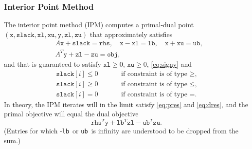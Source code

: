 \documentclass{article}
\newcommand{\ct}{\texttt}
\newcommand{\rvec}[1]{\left(#1\right)}
\newcommand{\obj}{\ct{obj}}
\newcommand{\rhs}{\ct{rhs}}
\newcommand{\lb}{\ct{lb}}
\newcommand{\ub}{\ct{ub}}
\newcommand{\x}{\ct{x}}
\newcommand{\slack}{\ct{slack}}
\newcommand{\xl}{\ct{xl}}
\newcommand{\xu}{\ct{xu}}
\newcommand{\y}{\ct{y}}
\newcommand{\zl}{\ct{zl}}
\newcommand{\zu}{\ct{zu}}
\begin{document}
\subsubsection*{Interior Point Method}
The interior point method (IPM) computes a primal-dual point
$\rvec{\x,\slack,\xl,\xu,\y,\zl,\zu}$ that approximately satisfies
\begin{subequations}
  \label{eq:res}
  \begin{align}
    \label{eq:pres}
    &A\x+\slack=\rhs, \quad \x-\xl=\lb, \quad \x+\xu=\ub,\\
    \label{eq:dres}
    &A^T\y+\zl-\zu=\obj,
  \end{align}
\end{subequations}
and that is guaranteed to satisfy $\xl\ge0$, $\xu\ge0$, \eqref{eq:signy} and
\begin{subequations}
  \label{eq:signslack}
  \begin{alignat}{2}
    \slack[i]\le0 &\quad& &\text{if constraint is of type $\ge$,} \\
    \slack[i]\ge0 && &\text{if constraint is of type $\le$,} \\
    \slack[i]=0 && &\text{if constraint is of type $=$.}
  \end{alignat}
\end{subequations}
In theory, the IPM iterates will in the limit satisfy \eqref{eq:pres} and
\eqref{eq:dres}, and the primal objective will equal the dual objective
\begin{equation}
  \label{eq:dobj}
  \rhs^T\y + \lb^T\zl - \ub^T\zu.
\end{equation}
(Entries for which -\lb\ or \ub\ is infinity are understood to be dropped from
the sum.)
\end{document}
